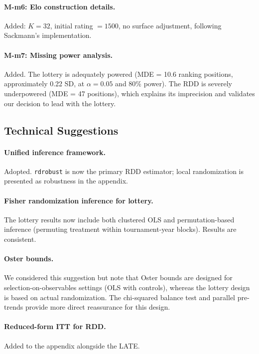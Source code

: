 \documentclass[12pt]{article}
\newcommand{\resp}[1]{\textcolor{response}{#1}}
\begin{document}
\paragraph{M-m6: Elo construction details.}
\resp{Added: $K = 32$, initial rating $= 1500$, no surface adjustment, following Sackmann's implementation.}

\paragraph{M-m7: Missing power analysis.}
\resp{Added. The lottery is adequately powered (MDE = 10.6 ranking positions, approximately 0.22 SD, at $\alpha = 0.05$ and 80\% power). The RDD is severely underpowered (MDE = 47 positions), which explains its imprecision and validates our decision to lead with the lottery.}

\subsection*{Technical Suggestions}

\paragraph{Unified inference framework.}
\resp{Adopted. \texttt{rdrobust} is now the primary RDD estimator; local randomization is presented as robustness in the appendix.}

\paragraph{Fisher randomization inference for lottery.}
\resp{The lottery results now include both clustered OLS and permutation-based inference (permuting treatment within tournament-year blocks). Results are consistent.}

\paragraph{Oster bounds.}
\resp{We considered this suggestion but note that Oster bounds are designed for selection-on-observables settings (OLS with controls), whereas the lottery design is based on actual randomization. The chi-squared balance test and parallel pre-trends provide more direct reassurance for this design.}

\paragraph{Reduced-form ITT for RDD.}
\resp{Added to the appendix alongside the LATE.}
\end{document}
